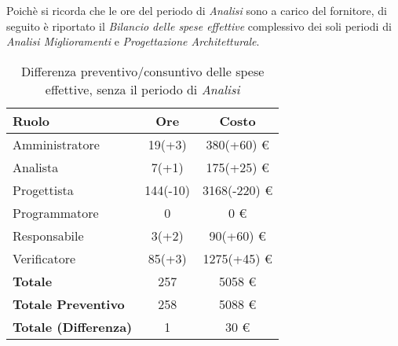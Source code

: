 Poichè si ricorda che le ore del periodo di \textit{Analisi} sono a carico del fornitore, di seguito è riportato il \textit{Bilancio delle spese effettive} complessivo dei soli periodi di \textit{Analisi Miglioramenti} e \textit{Progettazione Architetturale}.

\begin{table}[H]
	\centering
	\begin{tabular}{ l c c }
		\textbf{Ruolo} & \textbf{Ore} & \textbf{Costo} \\
		\hline
		Amministratore & 19(+3) & 380(+60) \euro{} \\
		Analista & 7(+1) & 175(+25) \euro{} \\
		Progettista & 144(-10) & 3168(-220) \euro{} \\
		Programmatore & 0 & 0 \euro{} \\
		Responsabile & 3(+2) & 90(+60) \euro{} \\
		Verificatore & 85(+3) & 1275(+45) \euro{} \\
		\hline
		\textbf{Totale \glossaryItem{Consuntivo}} & 257 & 5058 \euro{} \\
		\hline
		\textbf{Totale Preventivo} & 258 & 5088 \euro{} \\
		\hline
		\textbf{Totale (Differenza)} & 1 & 30 \euro{} \\
		\hline
	\end{tabular}
	\caption{Differenza preventivo/consuntivo delle spese effettive, senza il periodo di \textit{Analisi}}
\end{table}

\newpage
